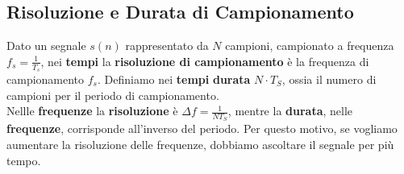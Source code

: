 \subsection{Risoluzione e Durata di Campionamento}
Dato un segnale $s(n)$ rappresentato da $N$ campioni, campionato a frequenza $f_s = \frac{1}{T_s}$, nei \textbf{tempi} la \textbf{risoluzione di campionamento} è la frequenza di campionamento $f_s$.
Definiamo nei \textbf{tempi} \textbf{durata} $N \cdot T_S$, ossia il numero di campioni per il periodo di campionamento.\\
Nellle \textbf{frequenze} la \textbf{risoluzione} è $\Delta f = \frac{1}{NT_S}$, mentre la \textbf{durata}, nelle \textbf{frequenze}, corrisponde all'inverso del periodo. Per questo motivo,
se vogliamo aumentare la risoluzione delle frequenze, dobbiamo ascoltare il segnale per più tempo.

